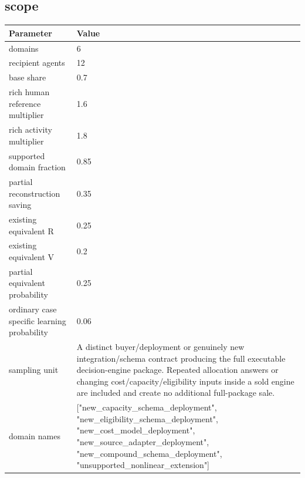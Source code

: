 \documentclass[10pt]{article}
\begin{document}
\subsection*{scope}

\begin{longtable}{p{.44\linewidth}p{.50\linewidth}}\toprule Parameter & Value \\\midrule\endhead

domains & 6\\

recipient agents & 12\\

base share & 0.7\\

rich human reference multiplier & 1.6\\

rich activity multiplier & 1.8\\

supported domain fraction & 0.85\\

partial reconstruction saving & 0.35\\

existing equivalent R & 0.25\\

existing equivalent V & 0.2\\

partial equivalent probability & 0.25\\

ordinary case specific learning probability & 0.06\\

sampling unit & A distinct buyer/deployment or genuinely new integration/schema contract producing the full executable decision-engine package. Repeated allocation answers or changing cost/capacity/eligibility inputs inside a sold engine are included and create no additional full-package sale.\\

domain names & ["new\_\allowbreak{}capacity\_\allowbreak{}schema\_\allowbreak{}deployment", "new\_\allowbreak{}eligibility\_\allowbreak{}schema\_\allowbreak{}deployment", "new\_\allowbreak{}cost\_\allowbreak{}model\_\allowbreak{}deployment", "new\_\allowbreak{}source\_\allowbreak{}adapter\_\allowbreak{}deployment", "new\_\allowbreak{}compound\_\allowbreak{}schema\_\allowbreak{}deployment", "unsupported\_\allowbreak{}nonlinear\_\allowbreak{}extension"]\\


\end{longtable}
\end{document}
